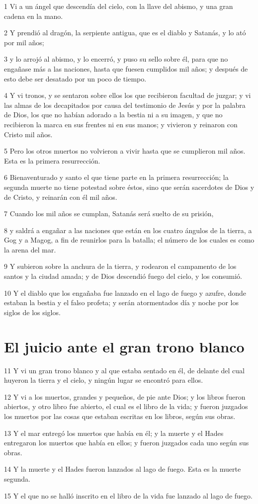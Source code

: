 \par 1 Vi a un ángel que descendía del cielo, con la llave del abismo, y una gran cadena en la mano.
\par 2 Y prendió al dragón, la serpiente antigua, que es el diablo y Satanás, y lo ató por mil años;
\par 3 y lo arrojó al abismo, y lo encerró, y puso su sello sobre él, para que no engañase más a las naciones, hasta que fuesen cumplidos mil años; y después de esto debe ser desatado por un poco de tiempo.
\par 4 Y vi tronos, y se sentaron sobre ellos los que recibieron facultad de juzgar; y vi las almas de los decapitados por causa del testimonio de Jesús y por la palabra de Dios, los que no habían adorado a la bestia ni a su imagen, y que no recibieron la marca en sus frentes ni en sus manos; y vivieron y reinaron con Cristo mil años.
\par 5 Pero los otros muertos no volvieron a vivir hasta que se cumplieron mil años. Esta es la primera resurrección.
\par 6 Bienaventurado y santo el que tiene parte en la primera resurrección; la segunda muerte no tiene potestad sobre éstos, sino que serán sacerdotes de Dios y de Cristo, y reinarán con él mil años.
\par 7 Cuando los mil años se cumplan, Satanás será suelto de su prisión,
\par 8 y saldrá a engañar a las naciones que están en los cuatro ángulos de la tierra, a Gog y a Magog, a fin de reunirlos para la batalla; el número de los cuales es como la arena del mar.
\par 9 Y subieron sobre la anchura de la tierra, y rodearon el campamento de los santos y la ciudad amada; y de Dios descendió fuego del cielo, y los consumió.
\par 10 Y el diablo que los engañaba fue lanzado en el lago de fuego y azufre, donde estaban la bestia y el falso profeta; y serán atormentados día y noche por los siglos de los siglos.

\section*{El juicio ante el gran trono blanco}

\par 11 Y vi un gran trono blanco y al que estaba sentado en él, de delante del cual huyeron la tierra y el cielo, y ningún lugar se encontró para ellos.
\par 12 Y vi a los muertos, grandes y pequeños, de pie ante Dios; y los libros fueron abiertos, y otro libro fue abierto, el cual es el libro de la vida; y fueron juzgados los muertos por las cosas que estaban escritas en los libros, según sus obras.
\par 13 Y el mar entregó los muertos que había en él; y la muerte y el Hades entregaron los muertos que había en ellos; y fueron juzgados cada uno según sus obras.
\par 14 Y la muerte y el Hades fueron lanzados al lago de fuego. Esta es la muerte segunda.
\par 15 Y el que no se halló inscrito en el libro de la vida fue lanzado al lago de fuego.

